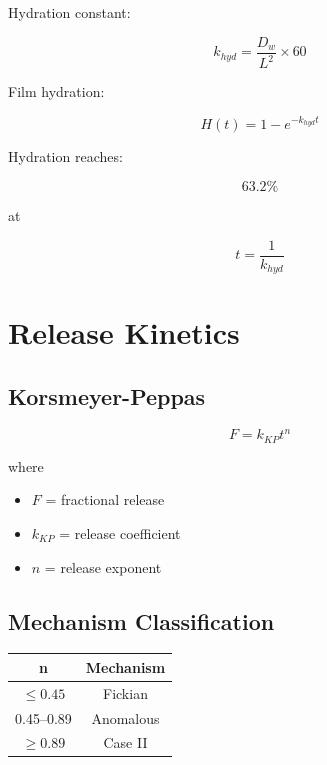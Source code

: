 \documentclass[11pt]{article}
\begin{document}
Hydration constant:

\begin{equation}
k_{hyd}
=
\frac{D_w}{L^2}\times60
\end{equation}

Film hydration:

\begin{equation}
H(t)=1-e^{-k_{hyd}t}
\end{equation}

Hydration reaches:

\begin{equation}
63.2\%
\end{equation}

at

\begin{equation}
t=\frac1{k_{hyd}}
\end{equation}

\section{Release Kinetics}

\subsection{Korsmeyer-Peppas}

\begin{equation}
F=k_{KP}t^n
\end{equation}

where

\begin{itemize}
\item $F$ = fractional release
\item $k_{KP}$ = release coefficient
\item $n$ = release exponent
\end{itemize}

\subsection{Mechanism Classification}

\begin{center}
\begin{tabular}{cc}
\toprule
n & Mechanism\\
\midrule
$\le0.45$ & Fickian\\
0.45--0.89 & Anomalous\\
$\ge0.89$ & Case II\\
\bottomrule
\end{tabular}
\end{center}
\end{document}
